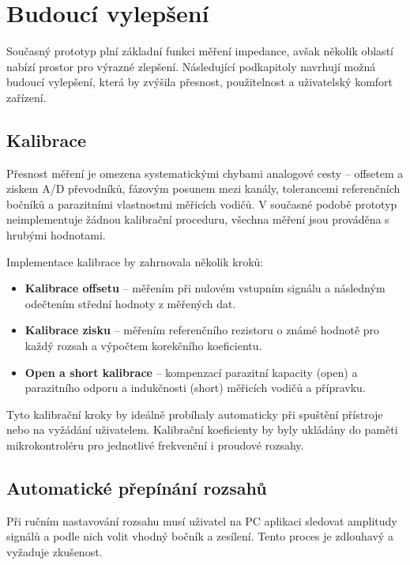 \chapter{Budoucí vylepšení}

Současný prototyp plní základní funkci měření impedance, avšak několik oblastí nabízí prostor pro výrazné zlepšení. Následující podkapitoly navrhují možná budoucí vylepšení, která by zvýšila přesnost, použitelnost a uživatelský komfort zařízení.

\section{Kalibrace}

Přesnost měření je omezena systematickými chybami analogové cesty -- offsetem a ziskem A/D převodníků, fázovým posunem mezi kanály, tolerancemi referenčních bočníků a parazitními vlastnostmi měřicích vodičů. V současné podobě prototyp neimplementuje žádnou kalibrační proceduru, všechna měření jsou prováděna s hrubými hodnotami.

Implementace kalibrace by zahrnovala několik kroků:

\begin{itemize}
    \item \textbf{Kalibrace offsetu} -- měřením při nulovém vstupním signálu a následným odečtením střední hodnoty z měřených dat.
    \item \textbf{Kalibrace zisku} -- měřením referenčního rezistoru o známé hodnotě pro každý rozsah a výpočtem korekčního koeficientu.
    \item \textbf{Open a short kalibrace} -- kompenzací parazitní kapacity (open) a parazitního odporu a indukčnosti (short) měřicích vodičů a přípravku.
\end{itemize}

Tyto kalibrační kroky by ideálně probíhaly automaticky při spuštění přístroje nebo na vyžádání uživatelem. Kalibrační koeficienty by byly ukládány do paměti mikrokontroléru pro jednotlivé frekvenční i proudové rozsahy.

\section{Automatické přepínání rozsahů}

Při ručním nastavování rozsahu musí uživatel na PC aplikaci sledovat amplitudy signálů a podle nich volit vhodný bočník a zesílení. Tento proces je zdlouhavý a vyžaduje zkušenost.

